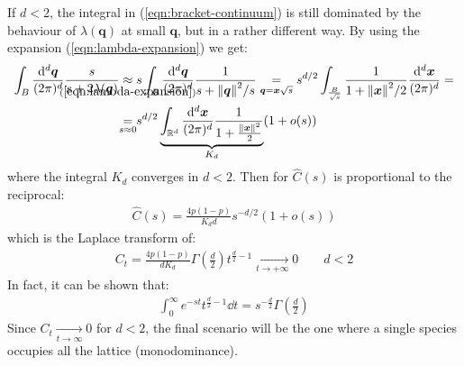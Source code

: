 \documentclass[../../main.tex]{subfiles}
\begin{document}
If $d < 2$, the integral in (\ref{eqn:bracket-continuum}) is still dominated by the behaviour of $\lambda(\bm{q})$ at small $\bm{q}$, but in a rather different way. By using the expansion (\ref{eqn:lambda-expansion}) we get:
\begin{align*}
    \int_B \frac{\dd[d]{\bm{q}}}{(2\pi)^d} \frac{s}{s+2\lambda(\bm{q})}  &\underset{\mathclap{(\ref{eqn:lambda-expansion})}}{\approx} s \int_B \frac{\dd[d]{\bm{q}}}{(2\pi)^d} \frac{1}{s+ \norm{\bm{q}}^2/s}   \underset{\bm{q} = \bm{x}\sqrt{s}}{=} s^{d/2} \int_{\frac{B}{\sqrt{s}}} \frac{1}{1+\norm{\bm{x}}^2/2} \frac{\dd[d]{\bm{x}}}{(2\pi)^d} =\\
    &\underset{\mathclap{s \approx 0}}{=}  s^{d/2} \underbrace{\int_{\mathbb{R}^d} \frac{\dd[d]{\bm{x}}}{(2\pi)^d} \frac{1}{1+\frac{\norm{\bm{x}}^2}{2} }}_{K_d}   (1 + o(s))
\end{align*}
where the integral $K_d$ converges in $d < 2$. Then for $\hat{C}(s)$ is proportional to the reciprocal:
\begin{align*}
    \hat{C}(s) = \frac{4p(1-p)}{K_d d} s^{-d/2} (1+o(s)) 
\end{align*}
which is the Laplace transform of:
\begin{align*}
    C_t = \frac{4p(1-p)}{d K_d} \Gamma\left(\frac{d}{2} \right) t^{\frac{d}{2}-1}  \xrightarrow[t \to +\infty]{}  0 \qquad d < 2
\end{align*}
In fact, it can be shown that:
\begin{align*}
    \int_0^\infty e^{-st} t^{\frac{d}{2}-1} \dd{t} = s^{-\frac{d}{2} } \Gamma\left(\frac{d}{2} \right)
\end{align*}
Since $C_t  \xrightarrow[t \to \infty]{} 0$ for $d<2$, the final scenario will be the one where a single species occupies all the lattice (monodominance).

\medskip
\end{document}
